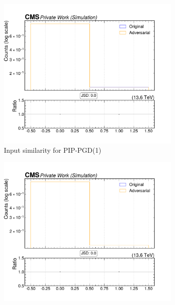 \begin{figure}[htbp]
  \centering
  \begin{subfigure}[t]{0.32\textwidth}
    \includegraphics[width=\linewidth]{media/output/features/compare/combined_it_1/cmp_npf_arr_Npfcan_isGamma.pdf}
    \caption*{Input similarity for PIP-PGD(1)}
  \end{subfigure}\hfill
  \begin{subfigure}[t]{0.32\textwidth}
    \includegraphics[width=\linewidth]{media/output/features/compare/combined_it_2/cmp_npf_arr_Npfcan_isGamma.pdf}

\end{subfigure}
\end{figure}
